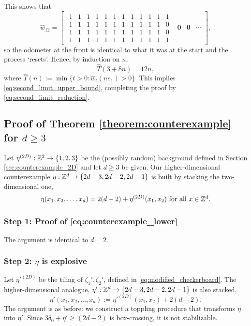 \documentclass[12pt]{amsart}
\begin{document}
This shows that
\[
\hat{w}_{12} = 
\begin{bmatrix}
\begin{smallmatrix}
1 & 1 & 1 & 1 & 1 & 1 & 1 & 1 & 1 & 1 & 1 & 1 \\ 
1 & 1 & 1 & 1 & 1 & 1 & 1 & 1 & 1 & 1 & 1 & 0 \\ 
1 & 1 & 1 & 1 & 1 & 1 & 1 & 1 & 1 & 1 & 1 & 0 \\ 
1 & 1 & 1 & 1 & 1 & 1 & 1 & 1 & 1 & 1 & 1 & 1
\end{smallmatrix}
& 
\mathbf{0} 
&
\mathbf{0} 
& \cdots
\end{bmatrix},
\]
so the odometer at the front is identical to what it was at the start and the process `resets'. Hence, 
by induction on $n$,
\begin{equation}
\hat{T}(3 + 8 n) = 12 n, 
\end{equation}
where $\hat{T}(n) := \min\{ t > 0 : \hat{w}_t(n e_1) > 0 \}$. 
This implies  \eqref{eq:second_limit_upper_bound}, completing the proof by \eqref{eq:second_limit_reduction}.



\subsection{Proof of Theorem \ref{theorem:counterexample} for \texorpdfstring{$d \geq 3$}{d > 2}} \label{sec:proof_of_generalization}
Let $\eta^{(2D)}: \mathbb{Z}^2 \to \{1, 2, 3\}$ be the (possibly random) background defined in Section \ref{sec:counterexample_2D} and let $d \geq 3$ be given. Our higher-dimensional counterexample $\eta: \mathbb{Z}^d \to \{ 2 d - 3, 2 d -2, 2 d - 1\}$
is built by stacking the two-dimensional one, 
\begin{equation} \label{eq:stacked_tiling1}
\eta(x_1, x_2, \ldots, x_d) = 2  (d- 2) + \eta^{(2D)}(x_1, x_2) \mbox{ for all $x \in \mathbb{Z}^d$}.
\end{equation}
\subsubsection*{Step 1: Proof of \eqref{eq:counterexample_lower}}
The argument is identical to $d = 2$. 



\subsubsection*{Step 2: $\eta$ is explosive}

Let ${\eta'}^{(2D)}$ be the tiling of $\zeta_1', \zeta_2'$, defined in \eqref{eq:modified_checkerboard}.
The higher-dimensional analogue, $\eta': \mathbb{Z}^d \to \{ 2 d - 3, 2 d -2, 2 d - 1\}$ is also stacked, 
\begin{equation} \label{eq:stacked_tiling2}
\eta'(x_1, x_2, \ldots, x_d) := {\eta'}^{(2D)}(x_1, x_2) + 2  (d - 2).
\end{equation}
The argument is as before: we construct a toppling procedure that transforms $\eta$ into $\eta'$. Since $3  \delta_0 + \eta' \geq (2 d - 2)$ is box-crossing, it is not stabilizable. 
\end{document}
